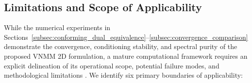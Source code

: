 \documentclass[preprint,12pt]{elsarticle}
\begin{document}
\subsection{Limitations and Scope of Applicability}
\label{subsec:limitations_scope}

While the numerical experiments in Sections~\ref{subsec:conforming_dual_equivalence}--\ref{subsec:convergence_comparison} demonstrate the convergence, conditioning stability, and spectral purity of the proposed VNMM 2D formulation, a mature computational framework requires an explicit delineation of its operational scope, potential failure modes, and methodological limitations \cite{slak2018refined}. We identify six primary boundaries of applicability:
\end{document}
